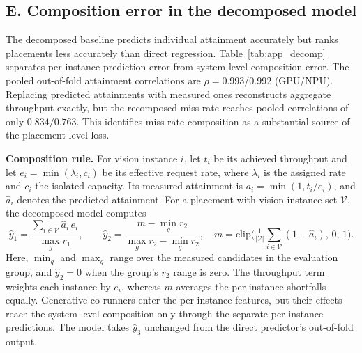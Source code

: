 \documentclass{article}
\begin{document}
\FloatBarrier
\subsection*{E. Composition error in the decomposed model}

The decomposed baseline predicts individual attainment accurately but ranks placements less accurately than direct regression. Table~\ref{tab:app_decomp} separates per-instance prediction error from system-level composition error. The pooled out-of-fold attainment correlations are $\rho{=}0.993/0.992$ (GPU/NPU). Replacing predicted attainments with measured ones reconstructs aggregate throughput exactly, but the recomposed miss rate reaches pooled correlations of only $0.834/0.763$. This identifies miss-rate composition as a substantial source of the placement-level loss.

\begin{table}[ht]
\centering
\caption{Decomposed-model error analysis. Pooled metrics aggregate all instance-level samples. Group-mean $\rho$ averages rank correlations across workload groups.}
\label{tab:app_decomp}
\footnotesize
{}
\end{table}

\textbf{Composition rule.} For vision instance $i$, let $t_i$ be its achieved throughput and let $e_i=\min(\lambda_i,c_i)$ be its effective request rate, where $\lambda_i$ is the assigned rate and $c_i$ the isolated capacity. Its measured attainment is $a_i=\min(1,t_i/e_i)$, and $\hat a_i$ denotes the predicted attainment. For a placement with vision-instance set $\mathcal{V}$, the decomposed model computes
\[
  \hat y_1 = \frac{\sum_{i\in\mathcal{V}} \hat a_i\, e_i}{\max_{g} r_1},
  \qquad
  \hat y_2 = \frac{m - \min_{g} r_2}{\max_{g} r_2 - \min_{g} r_2},
  \quad
  m = \mathrm{clip}\!\Big(\tfrac{1}{|\mathcal{V}|}\sum_{i\in\mathcal{V}} (1-\hat a_i),\, 0,\, 1\Big).
\]
Here, $\min_g$ and $\max_g$ range over the measured candidates in the evaluation group, and $\hat y_2{=}0$ when the group's $r_2$ range is zero. The throughput term weights each instance by $e_i$, whereas $m$ averages the per-instance shortfalls equally. Generative co-runners enter the per-instance features, but their effects reach the system-level composition only through the separate per-instance predictions. The model takes $\hat y_3$ unchanged from the direct predictor's out-of-fold output.
\end{document}
